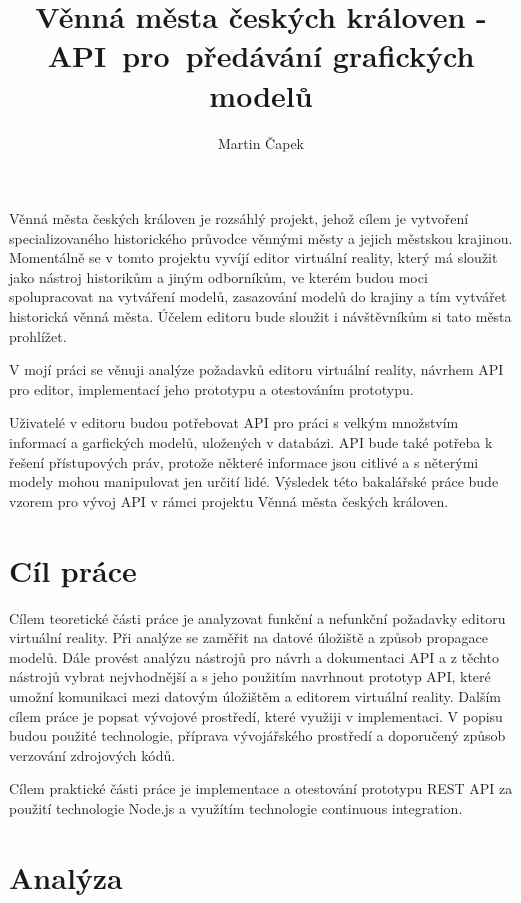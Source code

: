 \documentclass[thesis=B,czech]{FITthesis}[2012/06/26]
\title{Věnná města českých královen - API~pro~předávání grafických modelů}
\author{Martin Čapek} %
\begin{document}

\begin{introduction}
	 Věnná města českých královen je rozsáhlý projekt, jehož cílem je vytvoření specializovaného historického průvodce věnnými městy a jejich městskou krajinou.
	 Momentálně se v tomto projektu vyvíjí editor virtuální reality, který má sloužit jako nástroj historikům a jiným odborníkům, ve kterém budou moci spolupracovat na vytváření modelů, zasazování modelů do krajiny a tím vytvářet historická věnná města. Účelem editoru bude sloužit i návštěvníkům si tato města prohlížet.

	 V mojí práci se věnuji analýze požadavků editoru virtuální reality, návrhem API pro editor, implementací jeho prototypu a otestováním prototypu.
	 
	 Uživatelé v editoru budou potřebovat API pro práci s velkým množstvím informací a garfických modelů, uložených v databázi. API bude také potřeba k řešení přístupových práv, protože některé informace jsou citlivé a s něterými modely mohou manipulovat jen určití lidé. 
	 Výsledek této bakalářské práce bude vzorem pro vývoj API v rámci projektu Věnná města českých královen.
\end{introduction}

\chapter{Cíl práce}

    Cílem teoretické části práce je analyzovat funkční a nefunkční požadavky editoru virtuální reality. Při analýze se zaměřit na datové úložiště a způsob propagace modelů. Dále provést analýzu nástrojů pro návrh a dokumentaci API a z těchto nástrojů vybrat nejvhodnější a s jeho použitím navrhnout prototyp API, které umožní komunikaci mezi datovým úložištěm a editorem virtuální reality.
    Dalším cílem práce je popsat vývojové prostředí, které využiji v implementaci. V popisu budou použité technologie, příprava vývojářského prostředí a doporučený způsob verzování zdrojových kódů.
    
    Cílem praktické části práce je implementace a otestování prototypu REST API za použití technologie Node.js a využítím technologie continuous integration.


\chapter{Analýza}
\end{document}
